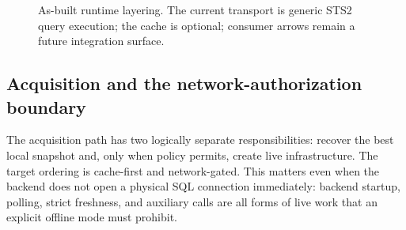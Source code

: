\documentclass[11pt]{article}
\begin{document}
\begin{figure}[H]
{}
\caption{As-built runtime layering. The current transport is generic STS2 query execution; the cache is optional; consumer arrows remain a future integration surface.}
\label{fig:architecture}
\end{figure}

\subsection{Acquisition and the network-authorization boundary}

The acquisition path has two logically separate responsibilities: recover the best local snapshot and, only when policy permits, create live infrastructure. The target ordering is cache-first and network-gated. This matters even when the backend does not open a physical SQL connection immediately: backend startup, polling, strict freshness, and auxiliary calls are all forms of live work that an explicit offline mode must prohibit.
\end{document}
